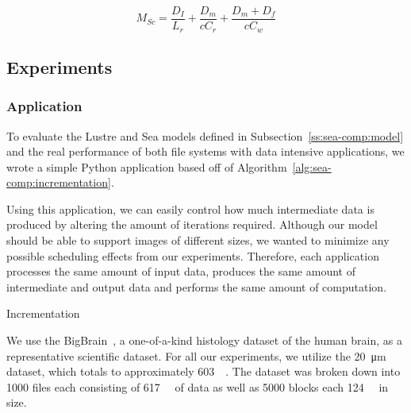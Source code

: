       \begin{equation}\label{eq:sea-comp:msc}
          M_{Sc} = \frac{D_{I}}{L_{r}} + \frac{D_{m}}{cC_{r}} + \frac{D_{m} + D_{f}}{cC_{w}}
      \end{equation}
\subsection{Experiments}
\subsubsection{Application}


      To evaluate the Lustre and Sea models defined in
      Subsection~\ref{ss:sea-comp:model} and the real performance of both file
      systems with data intensive applications, we wrote a simple Python
      application based off of Algorithm~\ref{alg:sea-comp:incrementation}.
      
      Using this application, we can easily control how much intermediate data
      is produced by altering the amount of iterations required. Although our
      model should be able to support images of different sizes, we wanted to
      minimize any possible scheduling effects from our experiments. Therefore,
      each application processes the same amount of input data, produces the
      same amount of intermediate and output data and performs the same amount
      of computation.
                                                                                   

    \begin{algorithm2e}\caption{Incrementation}\label{alg:sea-comp:incrementation}
    \SetAlgoLined {}  
    \end{algorithm2e}

      We use the BigBrain~\cite{amunts2013bigbrain}, a one-of-a-kind histology
      dataset of the human brain, as a representative scientific dataset. For
      all our experiments, we utilize the \SI{20}{\micro\meter} dataset, which
      totals to approximately \SI{603}{\gibi\byte}. The dataset was broken down
      into 1000 files each consisting of \SI{617}{\mebi\byte} of data as well as
      5000 blocks each \SI{124}{\mebi\byte} in size.
      
